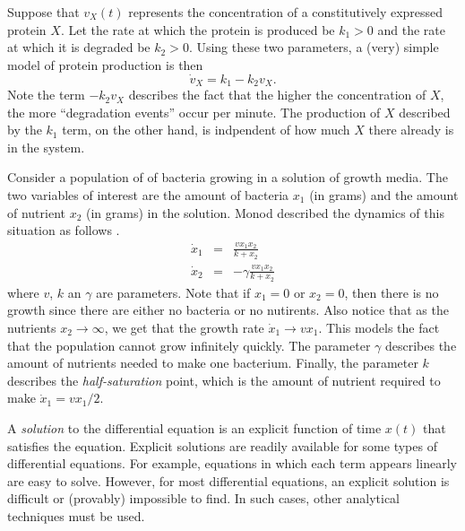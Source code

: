
\begin{example} \label{ex:gene-exp} Suppose that $v_X(t)$ represents
  the concentration of a constitutively expressed protein $X$. Let the
  rate at which the protein is produced be $k_1 > 0$ and the rate at
  which it is degraded be $k_2 > 0$. Using these two parameters, a
  (very) simple model of protein production is then
%
\begin{equation}\label{eqn:gene-exp}
\dot v_X = k_1 - k_2 v_X .
\end{equation}
%
Note the term $-k_2 v_X$ describes the fact that the higher the
concentration of $X$, the more ``degradation events'' occur per
minute. The production of $X$ described by the $k_1$ term, on the
other hand, is indpendent of how much $X$ there already is in the
system. \enx
\end{example}

\begin{example} \label{ex:growth} Consider a population of of bacteria
  growing in a solution of growth media. The two variables of interest
  are the amount of bacteria $x_1$ (in grams) and the amount of nutrient
  $x_2$ (in grams) in the solution. Monod described the dynamics of this
  situation as follows \cite{monod-growth}.
\begin{eqnarray}
\dot x_1 & = & \frac{v x_1 x_2}{k+x_2} \nonumber  \\
\dot x_2 & = & - \gamma \frac{v x_1 x_2}{k+x_2} \label{eqn:monod}
\end{eqnarray}
where $v$, $k$ an $\gamma$ are parameters. Note that if $x_1=0$ or
$x_2=0$, then there is no growth since there are either no bacteria or
no nutirents. Also notice that as the nutrients $x_2 \rightarrow
\infty$, we get that the growth rate $\dot x_1 \rightarrow v
x_1$. This models the fact that the population cannot grow infinitely
quickly. The parameter $\gamma$ describes the amount of nutrients
needed to make one bacterium. Finally, the parameter $k$ describes the
{\em half-saturation} point, which is the amount of nutrient required
to make $\dot x_1 = v x_1 / 2$. \enx
\end{example}

A {\em solution} to the differential equation  is an explicit
function of time $x(t)$ that satisfies the equation. Explicit
solutions are readily available for some types of differential
equations. For example, equations in which each term appears linearly
are easy to solve. However, for most differential equations, an
explicit solution is difficult or (provably) impossible to find. In
such cases, other analytical techniques must be used. 

